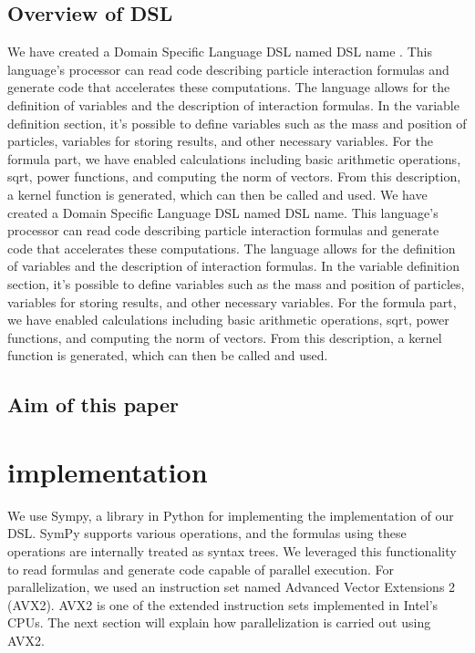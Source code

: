 \documentclass[ams]{U-AizuGT}
\begin{document}
\subsection{Overview of DSL}

We have created a Domain Specific Language \lparen DSL \rparen named \lparen DSL name \rparen. This language's 
processor can read code describing particle interaction formulas and generate code 
that accelerates these computations. The language allows for the definition of 
variables and the description of interaction formulas. In the variable definition 
section, it's possible to define variables such as the mass and position of 
particles, variables for storing results, and other necessary variables. For the formula
part, we have enabled calculations including basic arithmetic operations, sqrt, power 
functions, and computing the norm of vectors. From this description, a kernel function 
is generated, which can then be called and used. We have created a Domain Specific 
Language \lparen DSL \rparen named \lparen DSL name\rparen. This language's processor can read code describing particle 
interaction formulas and generate code that accelerates these computations. The language allows
for the definition of variables and the description of interaction formulas. In the variable
definition section, it's possible to define variables such as the mass and position of 
particles, variables for storing results, and other necessary variables. For the formula part, 
we have enabled calculations including basic arithmetic operations, sqrt, power functions, and 
computing the norm of vectors. From this description, a kernel function is generated, which can then be called and used.
\subsection{Aim of this paper}



\section{implementation}
We use Sympy, a library in Python for implementing  the implementation of our \lparen DSL\rparen .
SymPy supports various operations, and the formulas using these operations are internally treated as 
syntax trees. We leveraged this functionality to read formulas and generate code capable of parallel execution.
For parallelization, we used an instruction set named Advanced Vector Extensions 2 (AVX2). AVX2 is one of the 
extended instruction sets implemented in Intel's CPUs. The next section will explain how parallelization is carried out using AVX2.
\end{document}
